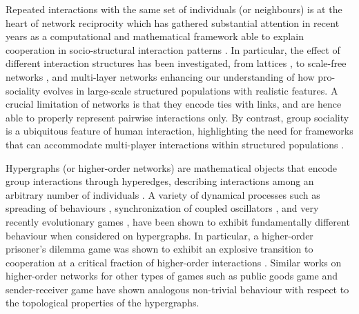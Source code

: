 \documentclass[a4paper,pre,reqno,superscriptaddress,twocolumn, floatfix]{revtex4}
\begin{document}
Repeated interactions with the same set of individuals (or neighbours) is at the heart of network reciprocity which has gathered substantial attention in recent years as a computational and mathematical framework able to explain cooperation in socio-structural interaction patterns \cite{hofbauer_evolutionary_1998, santos_scale-free_2005, lieberman_evolutionary_2005, nowak_five_2006, santos_evolutionary_2006, szabo_evolutionary_2007, gomez-gardenes_dynamical_2007}. In particular, the effect of different interaction structures has been investigated, from lattices \cite{nowak_evolutionary_1992, szabo_evolutionary_2007, kumar_evolution_2020}, to scale-free networks \cite{santos_scale-free_2005, santos_social_2008}, and multi-layer networks \cite{wang_evolutionary_2015, battiston_determinants_2017,su_evolution_2022} enhancing our understanding of how pro-sociality evolves in large-scale structured populations with realistic features. A crucial limitation of networks is that they encode ties with links, and are hence able to properly represent pairwise interactions only. By contrast, group sociality is a ubiquitous feature of human interaction, highlighting the need for frameworks that can accommodate multi-player interactions within structured populations \cite{broom_multi-player_1997, tarnita_set_game_2009, gokhale_evolutionary_2010, broom_generalized_2019}. 



Hypergraphs (or higher-order networks) are mathematical objects that encode group interactions through hyperedges, describing interactions among an arbitrary number of individuals \cite{battiston_networks_2020, battiston_physics_2021}. A variety of dynamical processes such as spreading of behaviours \cite{iacopini_simplicial_2019}, synchronization of coupled oscillators \cite{skardal_higher_2020, gambuzza_stability_2021,zhang_higher-order_2023}, and very recently evolutionary games \cite{civilini_evolutionary_2021, alvarez-rodriguez_evolutionary_2021, guo_evolutionary_2021}, have been shown to exhibit fundamentally different behaviour when considered on hypergraphs. In particular, a higher-order prisoner's dilemma game was shown to exhibit an explosive transition to cooperation at a critical fraction of higher-order interactions \cite{civilini_explosive_2024}. Similar works on higher-order networks for other types of games such as public goods game \cite{wang_evolutionary_2024} and sender-receiver game \cite{kumar_evolution_2021} have shown analogous non-trivial behaviour with respect to the topological properties of the hypergraphs.
\end{document}
